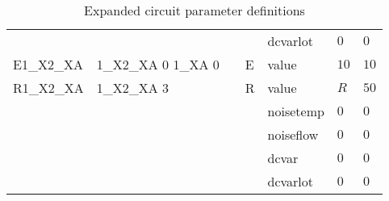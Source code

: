 \begin{table}[H]
\begin{tabular}[c]{lllllll}
\rowcolor{myyellow}
 & & & &\small{dcvarlot} &$0$ &$0$ \\ 
\small{E1\_X2\_XA} &\small{1\_X2\_XA 0 1\_XA 0 } & &\small{E} &\small{value} &$10$ &$10$ \\ 
\rowcolor{myyellow}
\small{R1\_X2\_XA} &\small{1\_X2\_XA 3 } & &\small{R} &\small{value} &$R$ &$50$ \\ 
 & & & &\small{noisetemp} &$0$ &$0$ \\ 
\rowcolor{myyellow}
 & & & &\small{noiseflow} &$0$ &$0$ \\ 
 & & & &\small{dcvar} &$0$ &$0$ \\ 
\rowcolor{myyellow}
 & & & &\small{dcvarlot} &$0$ &$0$ \\ 
\end{tabular}
\caption{Expanded circuit parameter definitions}
\end{table}

